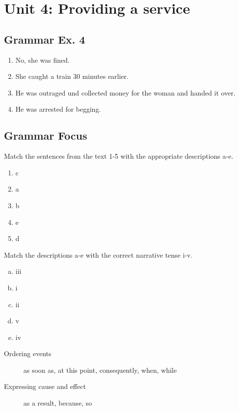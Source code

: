 \documentclass[12pt, a4paper, oneside]{article}
\begin{document}
  \section{Unit 4: Providing a service}
  \subsection{Grammar Ex. 4}
  \begin{enumerate}[1.]
    \item No, she was fined.
    \item She caught a train 30 minutes earlier.
    \item He was outraged und collected money for the woman and handed it over.
    \item He was arrested for begging.
  \end{enumerate}

  \subsection{Grammar Focus}
  Match the sentences from the text 1-5 with the appropriate descriptions a-e.
  \begin{enumerate}[1.]
    \item c
    \item a
    \item b
    \item e
    \item d
  \end{enumerate}
  
  Match the descriptions a-e with the correct narrative tense i-v.
  \begin{enumerate}[a.]
    \item iii
    \item i
    \item ii
    \item v
    \item iv
  \end{enumerate}

  \begin{description}
    \item[Ordering events] as soon as, at this point, consequently, when, while
    \item[Expressing cause and effect] as a result, because, so
  \end{description} 
\end{document}
